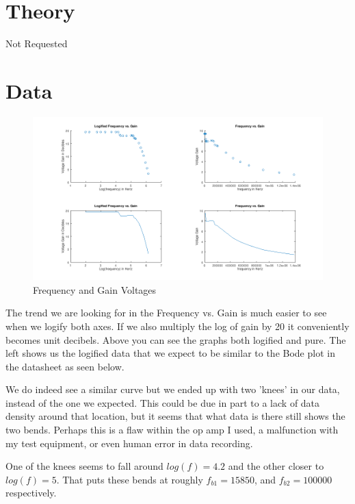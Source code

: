 \documentclass[prb,preprint]{revtex4-1}
\begin{document}
\section{Theory}
Not Requested

\section{Data}

\begin{figure}[ht]
\centering
\includegraphics[width=7in]{bigGraph.png}
\caption{Frequency and Gain Voltages}
\label{fig1}
\end{figure}

The trend we are looking for in the Frequency vs. Gain is much easier to see when we logify both axes. If we also multiply the log of gain by 20 it conveniently becomes unit decibels. Above you can see the graphs both logified and pure. The left shows us the logified data that we expect to be similar to the Bode plot in the datasheet as seen below.

We do indeed see a similar curve but we ended up with two 'knees' in our data, instead of the one we expected. This could be due in part to a lack of data density around that location, but it seems that what data is there still shows the two bends. Perhaps this is a flaw within the op amp I used, a malfunction with my test equipment, or even human error in data recording.

One of the knees seems to fall around $log(f)=4.2$ and the other closer to $log(f)=5$. That puts these bends at roughly $f_{b1}=15850$, and $f_{b2}=100000$ respectively.
\end{document}
